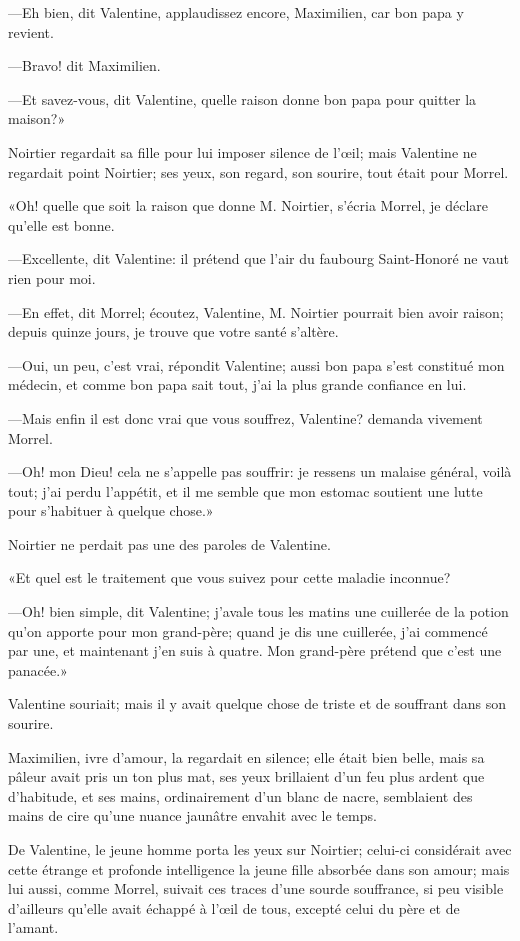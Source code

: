 —Eh bien, dit Valentine, applaudissez encore, Maximilien, car bon papa y revient. 

—Bravo! dit Maximilien. 

—Et savez-vous, dit Valentine, quelle raison donne bon papa pour quitter la maison?» 

Noirtier regardait sa fille pour lui imposer silence de l'œil; mais Valentine ne regardait point Noirtier; ses yeux, son regard, son sourire, tout était pour Morrel. 

«Oh! quelle que soit la raison que donne M. Noirtier, s'écria Morrel, je déclare qu'elle est bonne. 

—Excellente, dit Valentine: il prétend que l'air du faubourg Saint-Honoré ne vaut rien pour moi. 

—En effet, dit Morrel; écoutez, Valentine, M. Noirtier pourrait bien avoir raison; depuis quinze jours, je trouve que votre santé s'altère. 

—Oui, un peu, c'est vrai, répondit Valentine; aussi bon papa s'est constitué mon médecin, et comme bon papa sait tout, j'ai la plus grande confiance en lui. 

—Mais enfin il est donc vrai que vous souffrez, Valentine? demanda vivement Morrel. 

—Oh! mon Dieu! cela ne s'appelle pas souffrir: je ressens un malaise général, voilà tout; j'ai perdu l'appétit, et il me semble que mon estomac soutient une lutte pour s'habituer à quelque chose.» 

Noirtier ne perdait pas une des paroles de Valentine. 

«Et quel est le traitement que vous suivez pour cette maladie inconnue? 

—Oh! bien simple, dit Valentine; j'avale tous les matins une cuillerée de la potion qu'on apporte pour mon grand-père; quand je dis une cuillerée, j'ai commencé par une, et maintenant j'en suis à quatre. Mon grand-père prétend que c'est une panacée.» 

Valentine souriait; mais il y avait quelque chose de triste et de souffrant dans son sourire. 

Maximilien, ivre d'amour, la regardait en silence; elle était bien belle, mais sa pâleur avait pris un ton plus mat, ses yeux brillaient d'un feu plus ardent que d'habitude, et ses mains, ordinairement d'un blanc de nacre, semblaient des mains de cire qu'une nuance jaunâtre envahit avec le temps. 

De Valentine, le jeune homme porta les yeux sur Noirtier; celui-ci considérait avec cette étrange et profonde intelligence la jeune fille absorbée dans son amour; mais lui aussi, comme Morrel, suivait ces traces d'une sourde souffrance, si peu visible d'ailleurs qu'elle avait échappé à l'œil de tous, excepté celui du père et de l'amant. 

